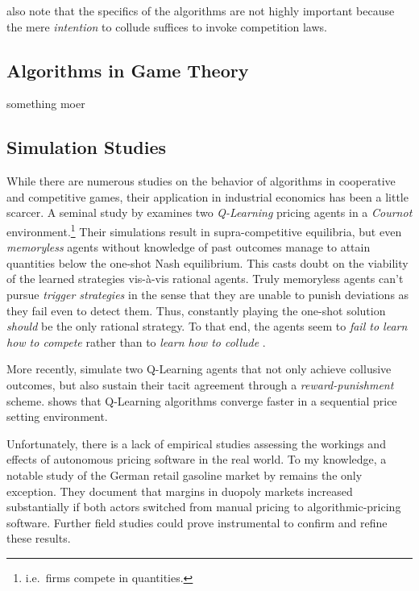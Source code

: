 \textcite{noa}


\textcite{bundeskartellamt_bundeskartellamt_nodate} also note that the specifics of the algorithms are not highly important because the mere \emph{intention} to collude suffices to invoke competition laws.


\subsection{Algorithms in Game Theory}

something moer

\subsection{Simulation Studies}

While there are numerous studies on the behavior of algorithms in cooperative and competitive games, their application in industrial economics has been a little scarcer. A seminal study by \textcite{waltman_q-learning_2008} examines two \emph{Q-Learning} pricing agents in a \emph{Cournot} environment.\footnote{i.e.\ firms compete in quantities.} Their simulations result in supra-competitive equilibria, but even \emph{memoryless} agents without knowledge of past outcomes manage to attain quantities below the one-shot Nash equilibrium.  This casts doubt on the viability of the learned strategies vis-à-vis rational agents. Truly memoryless agents can't pursue \emph{trigger strategies} in the sense that they are unable to punish deviations as they fail even to detect them. Thus, constantly playing the one-shot solution \emph{should} be the only rational strategy. To that end, the agents seem to \emph{fail to learn how to compete} rather than to \emph{learn how to collude} \parencite{cooper_learning_2015}. 






More recently, \textcite{calvano_artificial_2019} simulate two Q-Learning agents that not only achieve collusive outcomes, but also sustain their tacit agreement through a \emph{reward-punishment} scheme. \textcite{klein_autonomous_2019} shows that Q-Learning algorithms converge faster in a sequential price setting environment.







Unfortunately, there is a lack of empirical studies assessing the workings and effects of autonomous pricing software in the real world. To my knowledge, a notable study of the German retail gasoline market by \textcite{assad_algorithmic_2020} remains the only exception. They document that margins in duopoly markets increased substantially if both actors switched from manual pricing to algorithmic-pricing software. Further field studies could prove instrumental to confirm and refine these results.